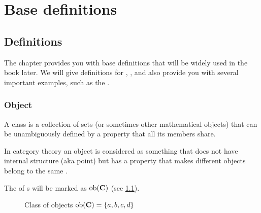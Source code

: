 \chapter{Base definitions}

\section{Definitions}

The chapter provides you with base definitions that will be widely used in the
book later.
We will give definitions for , ,
 and also provide you with several important examples,
such as the .

\subsection{Object}

\begin{definition}[Class]
  A class is a collection of sets (or sometimes other mathematical
  objects) that can be unambiguously defined by a property that all
  its members share. 
  \label{def:class}
\end{definition}

\begin{definition}[Object]
  \label{def:object}
  In category theory an object is considered as something that does not
  have internal structure (aka point) but has a property that makes
  different objects belong to the same .
\end{definition}

\begin{remark}
  \label{rem:objclass}
  The  of s will be marked as 
  $\mathrm{ob}(\mathbf{C})$ (see \cref{fig:class_of_objects}).
\end{remark}

\begin{figure}
  \centering
  \caption{Class of objects $\mathrm{ob}(\mathbf{C})=\{a,b,c,d\}$}
  \label{fig:class_of_objects}
\end{figure}

